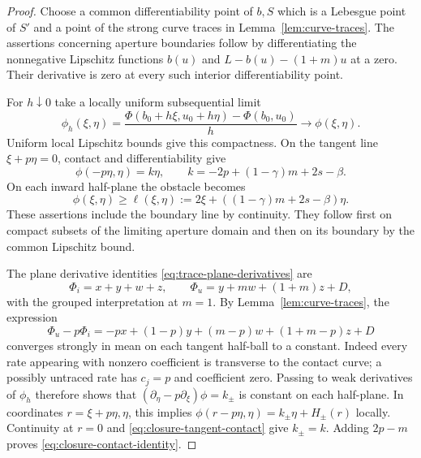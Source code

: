 \begin{proof}
Choose a common differentiability point of $b,S$ which is a Lebesgue
point of $S'$ and a point of the strong curve traces in
Lemma~\ref{lem:curve-traces}.  The assertions concerning aperture
boundaries follow by differentiating the nonnegative Lipschitz
functions $b(u)$ and $L-b(u)-(1+m)u$ at a zero.  Their derivative is
zero at every such interior differentiability point.

For $h\downarrow0$ take a locally uniform subsequential limit
\[
 \phi_h(\xi,\eta)
 =\frac{\Phi(b_0+h\xi,u_0+h\eta)-\Phi(b_0,u_0)}{h}
 \longrightarrow\phi(\xi,\eta).
\]
Uniform local Lipschitz bounds give this compactness.  On the tangent
line $\xi+p\eta=0$, contact and differentiability give
\begin{equation}
 \phi(-p\eta,\eta)=k\eta,
 \qquad k=-2p+(1-\gamma)m+2s-\beta.
 \label{eq:closure-tangent-contact}
\end{equation}
On each inward half-plane the obstacle becomes
\begin{equation}
 \phi(\xi,\eta)\ge
 \ell(\xi,\eta):=2\xi+((1-\gamma)m+2s-\beta)\eta.
 \label{eq:closure-linear-obstacle}
\end{equation}
These assertions include the boundary line by continuity.  They follow
first on compact subsets of the limiting aperture domain and then on
its boundary by the common Lipschitz bound.

The plane derivative identities \eqref{eq:trace-plane-derivatives} are
\[
 \Phi_i=x+y+w+z,\qquad
 \Phi_u=y+mw+(1+m)z+D,
\]
with the grouped interpretation at $m=1$.  By
Lemma~\ref{lem:curve-traces}, the expression
\[
 \Phi_u-p\Phi_i
 =-px+(1-p)y+(m-p)w+(1+m-p)z+D
\]
converges strongly in mean on each tangent half-ball to a constant.
Indeed every rate appearing with nonzero coefficient is transverse to
the contact curve; a possibly untraced rate has $c_j=p$ and coefficient
zero.  Passing to weak derivatives of $\phi_h$ therefore shows that
$(\partial_\eta-p\partial_\xi)\phi=k_\pm$ is constant on each
half-plane.  In coordinates $r=\xi+p\eta,\eta$, this implies
$\phi(r-p\eta,\eta)=k_\pm\eta+H_\pm(r)$ locally.  Continuity at
$r=0$ and \eqref{eq:closure-tangent-contact} give $k_\pm=k$.
Adding $2p-m$ proves \eqref{eq:closure-contact-identity}.


\end{proof}
